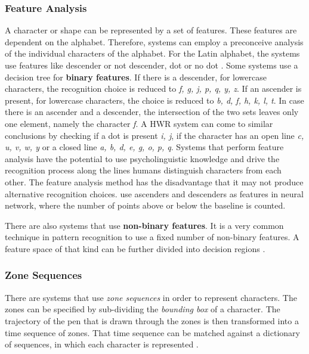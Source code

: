 \subsubsection{Feature Analysis}
\label{sec:featureanalysis}
A character or shape can be represented by a set of features. These features are
dependent on the alphabet. Therefore, systems can employ a preconceive analysis 
of the individual characters of the alphabet. For the Latin alphabet, the 
systems use features like descender or not descender, dot or no dot 
. Some systems use a decision tree for 
\textbf{binary features}. 
If there is a descender, for lowercase characters, the recognition choice is 
reduced to \emph{f, g, j, p, q, y, z}. If an ascender is present, for lowercase 
characters, the choice is reduced to \emph{b, d, f, h, k, l, t}. In case there
is an ascender and a descender, the intersection of the two sets leaves only 
one element, namely the character \emph{f}. A HWR system can come to similar 
conclusions by checking if a dot is present \emph{i, j}, if the character has an 
open line \emph{c, u, v, w, y} or a closed line \emph{a, b, d, e, g, o, p, q}. 
Systems that perform feature analysis have the potential to use psycholinguistic 
knowledge and drive the recognition process along the lines humans distinguish 
characters from each other. The feature analysis method has the disadvantage that
it may not produce alternative recognition choices.  use 
ascenders and descenders as features in neural network, 
where the number of points above or below the baseline is counted.

There are also systems that use \textbf{non-binary features}. It is a very common
technique in pattern recognition to use a fixed number of non-binary features.
A feature space of that kind can be further divided into decision regions
.

\subsubsection{Zone Sequences}
\label{sec:zonesequences}

There are systems that use \emph{zone sequences} in order to 
represent characters. The zones can be specified by sub-dividing the \emph{bounding box} of a character. The trajectory of the pen that is drawn through the zones
is then transformed into a time sequence of zones. That time sequence can be 
matched against a dictionary of sequences, in which each character is 
represented .


